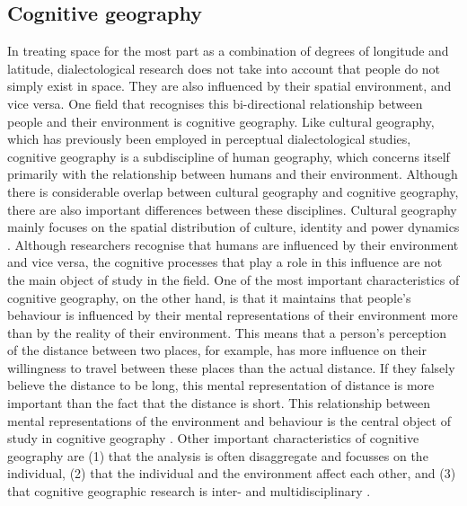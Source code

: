 \documentclass[output=paper,colorlinks,citecolor=brown,draft]{langscibook}
\begin{document}
\subsection{Cognitive geography}
In treating space for the most part as a combination of degrees of longitude and latitude, dialectological research does not take into account that people do not simply exist in space. They are also influenced by their spatial environment, and vice versa. One field that recognises this bi-directional relationship between people and their environment is cognitive geography. Like cultural geography, which has previously been employed in perceptual dialectological studies, cognitive geography is a subdiscipline of human geography, which concerns itself primarily with the relationship between humans and their environment. Although there is considerable overlap between cultural geography and cognitive geography, there are also important differences between these disciplines. Cultural geography mainly focuses on the spatial distribution of culture, identity and power dynamics \citep{anderson_handbook_2003}. Although researchers recognise that humans are influenced by their environment and vice versa, the cognitive processes that play a role in this influence are not the main object of study in the field. One of the most important characteristics of cognitive geography, on the other hand, is that it maintains that people's behaviour is influenced by their mental representations of their environment more than by the reality of their environment. This means that a person's perception of the distance between two places, for example, has more influence on their willingness to travel between these places than the actual distance. If they falsely believe the distance to be long, this mental representation of distance is more important than the fact that the distance is short. This relationship between mental representations of the environment and behaviour is the central object of study in cognitive geography \citep{montello_cognitive_2009, montello_behavioral_2018}. Other important characteristics of cognitive geography are (1) that the analysis is often disaggregate and focusses on the individual, (2) that the individual and the environment affect each other, and (3) that cognitive geographic research is inter- and multidisciplinary \citep{montello_behavioral_2018}. 
\end{document}
